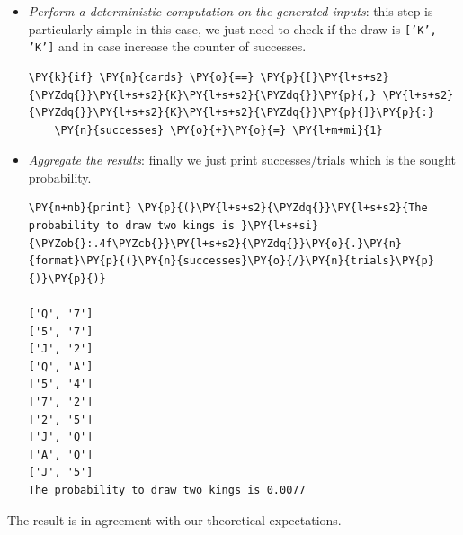 \begin{itemize}
\begin{codebox}[breakable, size=fbox, boxrule=1pt, pad at break*=1mm,colback=cellbackground, colframe=cellborder]
\begin{Verbatim}[commandchars=\\\{\}]
\PY{k}{for} \PY{n}{i} \PY{o+ow}{in} \PY{n+nb}{range}\PY{p}{(}\PY{n}{trials}\PY{p}{)}\PY{p}{:}
  \PY{n}{cards} \PY{o}{=} \PY{n}{sample}\PY{p}{(}\PY{n}{deck}\PY{p}{,} \PY{n}{k}\PY{o}{=}\PY{l+m+mi}{2}\PY{p}{)}
  \PY{k}{if} \PY{n}{i} \PY{o}{\PYZlt{}} \PY{l+m+mi}{10}\PY{p}{:}
    \PY{n+nb}{print} \PY{p}{(}\PY{n}{cards}\PY{p}{)}
\end{Verbatim}
\end{codebox}

\item \emph{Perform a deterministic computation on the generated inputs}: this step is particularly simple in this case, we just need to check if the draw is \texttt{['K', 'K']} and in case increase the counter of successes.

\begin{codebox}[breakable, size=fbox, boxrule=1pt, pad at break*=1mm,colback=cellbackground, colframe=cellborder]
\begin{Verbatim}[commandchars=\\\{\}]
  \PY{k}{if} \PY{n}{cards} \PY{o}{==} \PY{p}{[}\PY{l+s+s2}{\PYZdq{}}\PY{l+s+s2}{K}\PY{l+s+s2}{\PYZdq{}}\PY{p}{,} \PY{l+s+s2}{\PYZdq{}}\PY{l+s+s2}{K}\PY{l+s+s2}{\PYZdq{}}\PY{p}{]}\PY{p}{:}
    \PY{n}{successes} \PY{o}{+}\PY{o}{=} \PY{l+m+mi}{1}
 \end{Verbatim}
\end{codebox}

\item \emph{Aggregate the results}: finally we just print successes/trials which is the sought probability.

\begin{codebox}[breakable, size=fbox, boxrule=1pt, pad at break*=1mm,colback=cellbackground, colframe=cellborder]
\begin{Verbatim}[commandchars=\\\{\}]
\PY{n+nb}{print} \PY{p}{(}\PY{l+s+s2}{\PYZdq{}}\PY{l+s+s2}{The probability to draw two kings is }\PY{l+s+si}{\PYZob{}:.4f\PYZcb{}}\PY{l+s+s2}{\PYZdq{}}\PY{o}{.}\PY{n}{format}\PY{p}{(}\PY{n}{successes}\PY{o}{/}\PY{n}{trials}\PY{p}{)}\PY{p}{)}

['Q', '7']
['5', '7']
['J', '2']
['Q', 'A']
['5', '4']
['7', '2']
['2', '5']
['J', 'Q']
['A', 'Q']
['J', '5']
The probability to draw two kings is 0.0077
    \end{Verbatim}
\end{codebox}
\end{itemize}
The result is in agreement with our theoretical expectations.

